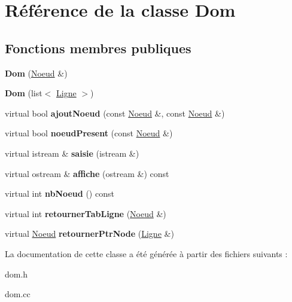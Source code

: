 \hypertarget{classDom}{
\section{Référence de la classe Dom}
\label{classDom}
}
\subsection*{Fonctions membres publiques}
\begin{DoxyCompactItemize}
\item 
\hypertarget{classDom_a3760e9581e6764d429fc68d070546f3f}{
{\bfseries Dom} (\hyperlink{classNoeud}{Noeud} \&)}
\label{classDom_a3760e9581e6764d429fc68d070546f3f}

\item 
\hypertarget{classDom_ae02da1237c5c884af49ea992417cfdcd}{
{\bfseries Dom} (list$<$ \hyperlink{classLigne}{Ligne} $>$)}
\label{classDom_ae02da1237c5c884af49ea992417cfdcd}

\item 
\hypertarget{classDom_ae640a720c988454576287a5b6c083a6a}{
virtual bool {\bfseries ajoutNoeud} (const \hyperlink{classNoeud}{Noeud} \&, const \hyperlink{classNoeud}{Noeud} \&)}
\label{classDom_ae640a720c988454576287a5b6c083a6a}

\item 
\hypertarget{classDom_ab700f17d298e9d403d1189e6cbd2e21e}{
virtual bool {\bfseries noeudPresent} (const \hyperlink{classNoeud}{Noeud} \&)}
\label{classDom_ab700f17d298e9d403d1189e6cbd2e21e}

\item 
\hypertarget{classDom_abae2486b2f93b2c45e3ff830219488b2}{
virtual istream \& {\bfseries saisie} (istream \&)}
\label{classDom_abae2486b2f93b2c45e3ff830219488b2}

\item 
\hypertarget{classDom_a692547ba6010fd70040e8b4ab2805349}{
virtual ostream \& {\bfseries affiche} (ostream \&) const }
\label{classDom_a692547ba6010fd70040e8b4ab2805349}

\item 
\hypertarget{classDom_ab7755b82fa26674d7d31833a0a38887b}{
virtual int {\bfseries nbNoeud} () const }
\label{classDom_ab7755b82fa26674d7d31833a0a38887b}

\item 
\hypertarget{classDom_a50701606026b355374e210ca659d9738}{
virtual int {\bfseries retournerTabLigne} (\hyperlink{classNoeud}{Noeud} \&)}
\label{classDom_a50701606026b355374e210ca659d9738}

\item 
\hypertarget{classDom_a227c734caf6f1d36a7cf5b21306b240b}{
virtual \hyperlink{classNoeud}{Noeud} {\bfseries retournerPtrNode} (\hyperlink{classLigne}{Ligne} \&)}
\label{classDom_a227c734caf6f1d36a7cf5b21306b240b}

\end{DoxyCompactItemize}


La documentation de cette classe a été générée à partir des fichiers suivants :\begin{DoxyCompactItemize}
\item 
dom.h\item 
dom.cc\end{DoxyCompactItemize}
